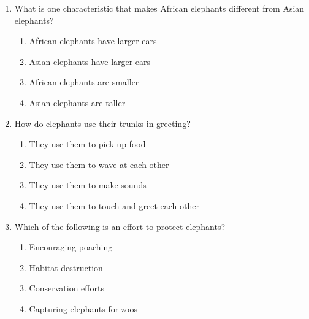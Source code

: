 \documentclass[12pt]{article}
\begin{document}
\begin{enumerate}
    \vspace{0.5cm}

    \item What is one characteristic that makes African elephants different from Asian elephants?

    \begin{enumerate}[label=\Alph*.]
        \item African elephants have larger ears
        \item Asian elephants have larger ears
        \item African elephants are smaller
        \item Asian elephants are taller
    \end{enumerate}
    
    \vspace{0.5cm}

    \item How do elephants use their trunks in greeting?

    \begin{enumerate}[label=\Alph*.]
        \item They use them to pick up food
        \item They use them to wave at each other
        \item They use them to make sounds
        \item They use them to touch and greet each other
    \end{enumerate}
    
    \vspace{0.5cm}

    \item Which of the following is an effort to protect elephants?

    \begin{enumerate}[label=\Alph*.]
        \item Encouraging poaching
        \item Habitat destruction
        \item Conservation efforts
        \item Capturing elephants for zoos
    \end{enumerate}

\end{enumerate}
\newpage
\end{document}
